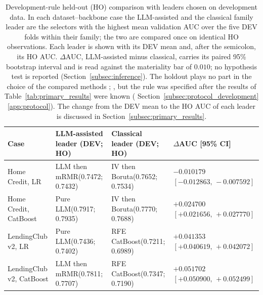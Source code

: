 \documentclass[final,5p,twocolumn]{elsarticle}
\providecommand{\DIFaddtex}[1]{{\protect\color{blue} \sf #1}} %
\providecommand{\DIFdeltex}[1]{{\protect\color{red} \scriptsize #1}} %
\providecommand{\DIFaddFL}[1]{\DIFadd{#1}} %
\providecommand{\DIFdelFL}[1]{\DIFdel{#1}} %
\providecommand{\DIFaddbeginFL}{} %
\providecommand{\DIFaddendFL}{} %
\providecommand{\DIFdelbeginFL}{} %
\providecommand{\DIFdelendFL}{} %
\providecommand{\DIFadd}[1]{\texorpdfstring{\DIFaddtex{#1}}{#1}} %
\providecommand{\DIFdel}[1]{\texorpdfstring{\DIFdeltex{#1}}{}} %
\begin{document}
\begin{table}[htbp]
\centering
\scriptsize
\setlength{\tabcolsep}{3pt}
\begin{threeparttable}
\caption{Development-rule held-out (HO) comparison with leaders chosen on development data. In each dataset--backbone case the LLM-assisted and the classical family leader are the selectors with the highest mean validation AUC over the five DEV folds within their family; the two are compared once on identical HO observations. Each leader is shown with its DEV mean and, after the semicolon, its HO AUC. $\Delta$AUC, LLM-assisted minus classical, carries its paired 95\% bootstrap interval and is read against the materiality bar \DIFdelbeginFL \DIFdelFL{of $0.010$; no hypothesis test is reported }\DIFdelendFL (Section~\ref{subsec:inference}). The holdout plays no part in the choice of the compared methods\DIFdelbeginFL \DIFdelFL{; }\DIFdelendFL \DIFaddbeginFL \DIFaddFL{, but }\DIFaddendFL the rule was specified after the results of Table~\ref{tab:primary_results} were known (\DIFdelbeginFL \DIFdelFL{Section~\ref{subsec:protocol_development}}\DIFdelendFL \DIFaddbeginFL \DIFaddFL{\ref{app:protocol}}\DIFaddendFL ). The change from the DEV mean to the HO AUC of each leader is discussed in Section~\ref{subsec:primary_results}.}
\label{tab:confirmatory}
\begin{tabular}{@{}L{24mm}L{30mm}L{27mm}L{38mm}@{}}
\toprule
Case & LLM-assisted leader (DEV; HO) & Classical leader (DEV; HO) & $\Delta$AUC [95\% CI] \\
\midrule
Home Credit, LR & LLM then mRMR\newline (0.7472; 0.7432) & IV then Boruta\newline (0.7652; 0.7534) & $-0.010179$\newline $[-0.012863,\,-0.007592]$ \\
\addlinespace
Home Credit, CatBoost & Pure LLM\newline (0.7917; 0.7935) & IV then Boruta\newline (0.7770; 0.7688) & $+0.024700$\newline $[+0.021656,\,+0.027770]$ \\
\addlinespace
LendingClub v2, LR & Pure LLM\newline (0.7436; 0.7402) & RFE CatBoost\newline (0.7211; 0.6989) & $+0.041353$\newline $[+0.040619,\,+0.042072]$ \\
\addlinespace
LendingClub v2, CatBoost & LLM then mRMR\newline (0.7811; 0.7707) & RFE CatBoost\newline (0.7347; 0.7190) & $+0.051702$\newline $[+0.050900,\,+0.052499]$ \\

\end{tabular}
\end{threeparttable}
\end{table}
\end{document}
